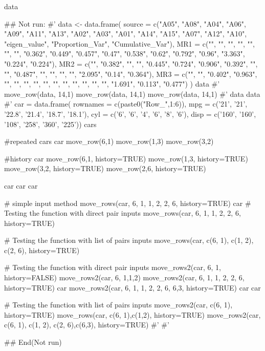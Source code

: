 \documentclass[a4paper]{book}
\begin{document}
%
\begin{Value}
data
\end{Value}
%
\begin{Examples}
\begin{ExampleCode}

\#\# Not run: 
#'
data <- data.frame(
  source = c("A05", "A08", "A04",
  "A06", "A09", "A11", "A13", "A02",
  "A03", "A01", "A14", "A15", "A07",
  "A12", "A10", "eigen_value", "Proportion_Var", "Cumulative_Var"),
  MR1 = c("", "", "", "", "", "", "",
  "0.362", "0.449", "0.457", "0.47",
  "0.538", "0.62", "0.792", "0.96",
  "3.363", "0.224", "0.224"),
  MR2 = c("", "0.382", "", "", "0.445",
  "0.724", "0.906", "0.392", "", "",
  "0.487", "", "", "", "", "2.095", "0.14", "0.364"),
  MR3 = c("", "", "0.402", "0.963", "",
   "", "", "", "", "", "", "", "",
    "", "", "1.691", "0.113", "0.477")
)
data
#'
move_row(data, 14,1)
move_row(data, 14,1)%
move_row(data, 14,1)%
#'
data %
data %
#'
car = data.frame(
  rownames = c(paste0("Row_",1:6)),
  mpg = c('21', '21', '22.8', '21.4', '18.7', '18.1'),
  cyl = c('6', '6', '4', '6', '8', '6'),
  disp = c('160', '160', '108', '258', '360', '225'))
cars

#repeated
cars
car %
  move_row(6,1)%
  move_row(1,3)%
  move_row(3,2)

#history
car %
  move_row(6,1, history=TRUE)%
  move_row(1,3, history=TRUE)%
  move_row(3,2, history=TRUE)%
  move_row(2,6, history=TRUE)

car%
car%
car%

# simple input method
move_rows(car, 6, 1, 1, 2, 2, 6, history=TRUE)
car%
# Testing the function with direct pair inputs
move_rows(car, 6, 1, 1, 2, 2, 6, history=TRUE)

# Testing the function with list of pairs inputs
move_rows(car, c(6, 1), c(1, 2), c(2, 6), history=TRUE)


# Testing the function with direct pair inputs
move_rows2(car, 6, 1,  history=FALSE)
move_rows2(car, 6, 1,1,2)
move_rows2(car, 6, 1, 1, 2, 2, 6, history=TRUE)
car%
move_rows2(car, 6, 1, 1, 2, 2, 6, 6,3, history=TRUE)
car%
car%


# Testing the function with list of pairs inputs
move_rows2(car, c(6, 1), history=TRUE)
move_rows(car, c(6, 1),c(1,2), history=TRUE)
move_rows2(car, c(6, 1), c(1, 2), c(2, 6),c(6,3), history=TRUE)
#'
#'




## End(Not run)

\end{ExampleCode}
\end{Examples}
\end{document}
